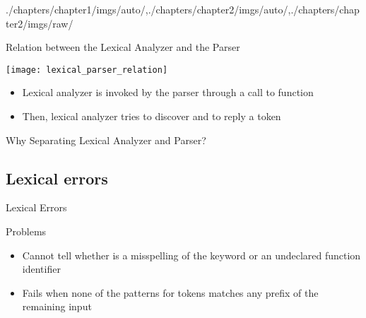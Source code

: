 \begin{graphicspathcontext}{{./chapters/chapter1/imgs/auto/},{./chapters/chapter2/imgs/auto/},{./chapters/chapter2/imgs/raw/}}
\begin{bibunit}[apalike]
\begin{frame}{Relation between the Lexical Analyzer and the Parser}
	\vspace{.5cm}
	\begin{center}
		\texttt{[image: lexical\_parser\_relation]}
	\end{center}
	\vspace{.5cm}
	\begin{itemize}
	\item Lexical analyzer is invoked by the parser through a call to  function
	\item Then, lexical analyzer tries to discover and to reply a token
	\end{itemize}
\end{frame}

\begin{frame}{{Why Separating} Lexical Analyzer and Parser?}
	\hfill
	\hfill
\end{frame}

\subsection{Lexical errors}
\subsectiontableofcontentslide

\begin{frame}[t]{Lexical Errors}
	\vspace{.25cm}
	\begin{example}
	\end{example}
	\vspace{.25cm}
	\begin{alertblock}{Problems}
		\begin{itemize}
		\item Cannot tell whether  is a misspelling of the keyword  or an undeclared function identifier
		\item Fails when none of the patterns for tokens matches any prefix of the remaining input
		\end{itemize}
	\end{alertblock}
	\vspace{.25cm}
\end{frame}


\end{bibunit}
\end{graphicspathcontext}
